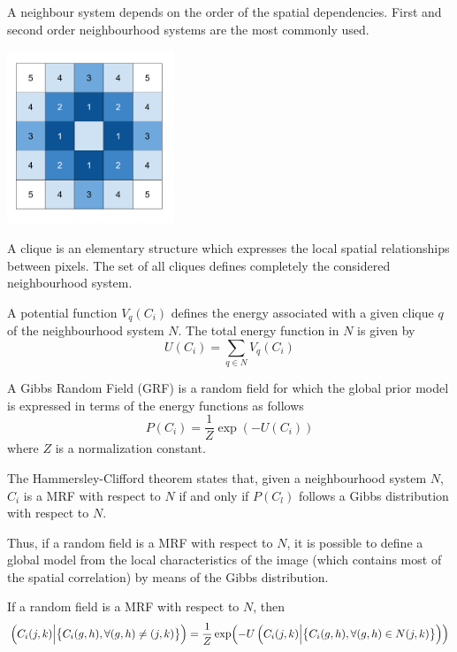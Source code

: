\documentclass[oneside,onecolumn]{report}
\let\P\relax
\DeclareMathOperator*{\P}{P}
\begin{document}
A neighbour system depends on the order of the spatial dependencies.
First and second order neighbourhood systems are the most commonly used.

\begin{center}
    \includegraphics[width=5cm]{neighbourhood_system.png}
\end{center}

A clique is an elementary structure which expresses the local spatial relationships between pixels. The set of all cliques defines completely the considered neighbourhood system.

A potential function $V_q(C_i)$ defines the energy associated with a given clique $q$ of the neighbourhood system $N$.
The total energy function in $N$ is given by
$$ U(C_i) = \sum_{q \in N} V_q(C_i) $$

A Gibbs Random Field (GRF) is a random field for which the global prior model is expressed in terms of the energy functions as follows
$$ P(C_i) = \frac{1}{Z} \exp(-U(C_i)) $$
where $Z$ is a normalization constant.

The Hammersley-Clifford theorem states that, given a neighbourhood system $N$, $C_i$ is a MRF with respect to $N$ if and only if $P(C_l)$ follows a Gibbs distribution with respect to $N$.

Thus, if a random field is a MRF with respect to $N$, it is possible to define a global model from the local characteristics of the image (which contains most of the spatial correlation) by means of the Gibbs distribution.

If a random field is a MRF with respect to $N$, then
$$ \P\Big(C_i(j, k) \Big| \big\{ C_i(g, h), \forall (g, h) \neq (j, k) \big\} \Big) = \frac{1}{Z} \exp(-U \left( C_i(j, k) \Big| \big\{ C_i(g, h), \forall (g, h) \in N(j, k) \big\} \right)) $$
\end{document}
